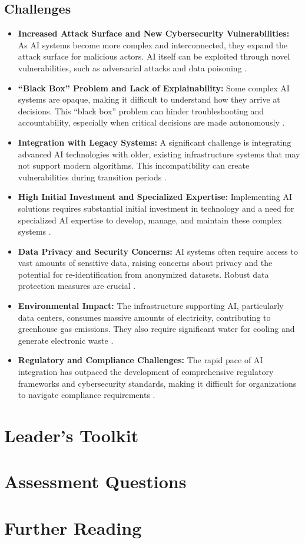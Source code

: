 \subsection{Challenges}
\begin{itemize}
    \item \textbf{Increased Attack Surface and New Cybersecurity Vulnerabilities:} As AI systems become more complex and interconnected, they expand the attack surface for malicious actors. AI itself can be exploited through novel vulnerabilities, such as adversarial attacks and data poisoning \parencite{Elewit2023}.
    \item \textbf{``Black Box'' Problem and Lack of Explainability:} Some complex AI systems are opaque, making it difficult to understand how they arrive at decisions. This ``black box'' problem can hinder troubleshooting and accountability, especially when critical decisions are made autonomously \parencite{Liberties2023}.
    \item \textbf{Integration with Legacy Systems:} A significant challenge is integrating advanced AI technologies with older, existing infrastructure systems that may not support modern algorithms. This incompatibility can create vulnerabilities during transition periods \parencite{DataFloq2023}.
    \item \textbf{High Initial Investment and Specialized Expertise:} Implementing AI solutions requires substantial initial investment in technology and a need for specialized AI expertise to develop, manage, and maintain these complex systems \parencite{TechNextCon2023}.
    \item \textbf{Data Privacy and Security Concerns:} AI systems often require access to vast amounts of sensitive data, raising concerns about privacy and the potential for re-identification from anonymized datasets. Robust data protection measures are crucial \parencite{EAJournals2023}.
    \item \textbf{Environmental Impact:} The infrastructure supporting AI, particularly data centers, consumes massive amounts of electricity, contributing to greenhouse gas emissions. They also require significant water for cooling and generate electronic waste \parencite{UNEP2023}.
    \item \textbf{Regulatory and Compliance Challenges:} The rapid pace of AI integration has outpaced the development of comprehensive regulatory frameworks and cybersecurity standards, making it difficult for organizations to navigate compliance requirements \parencite{Medium2023}.
\end{itemize}

\section{Leader's Toolkit}
\label{sec:ai_revolution_leaders_toolkit}

\section{Assessment Questions}
\label{sec:ai_revolution_assessment_questions}

\section{Further Reading}
\label{sec:ai_revolution_further_reading}